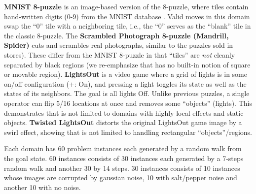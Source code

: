 \textbf{MNIST 8-puzzle}
is an image-based version of the 8-puzzle, where tiles contain hand-written digits (0-9) from the  MNIST database \cite{lecun1998gradient}.
Valid moves in this domain swap the ``0'' tile  with a neighboring tile, i.e., the ``0'' serves as the ``blank'' tile in the classic 8-puzzle. 
The \textbf{Scrambled Photograph 8-puzzle (Mandrill, Spider)} cuts and scrambles real photographs, similar to the puzzles sold in stores).
These differ from the MNIST 8-puzzle in that ``tiles'' are \textit{not} cleanly separated by black regions
(we re-emphasize that \latentplanner has no built-in notion of square or movable region).
\textbf{LightsOut} is
a video game where a grid of lights is in some on/off configuration ($+$: On),
and pressing a light toggles its state as well as the states of its neighbors.
The goal is all lights Off.
Unlike previous puzzles, a single operator can flip 5/16 locations at once and
removes some ``objects'' (lights).
This demonstrates that \latentplanner is not limited to domains with highly local effects and static objects.
\textbf{Twisted LightsOut} distorts the original LightsOut game image by a swirl effect, 
showing that \latentplanner is not limited to handling rectangular ``objects''/regions.

Each domain has 60 problem instances each generated by a random walk from
the goal state. 60 instances consists of 30 instances each generated by a 7-steps random walk
and another 30 by 14 steps. 30 instances consists of 10 instances whose images are corrupted by gaussian noise,
10 with salt/pepper noise and another 10 with no noise.

